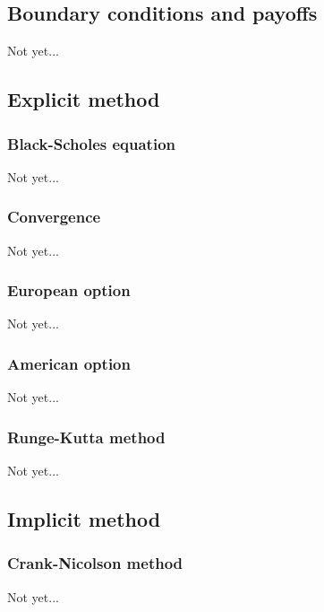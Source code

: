 \subsection{Boundary conditions and payoffs}
Not yet...



\subsection{Explicit method}

\subsubsection{Black-Scholes equation}
Not yet...


\subsubsection{Convergence}
Not yet...


\subsubsection{European option}
Not yet...


\subsubsection{American option}
Not yet...


\subsubsection{Runge-Kutta method}
Not yet...


\subsection{Implicit method}

\subsubsection{Crank-Nicolson method}
Not yet...



